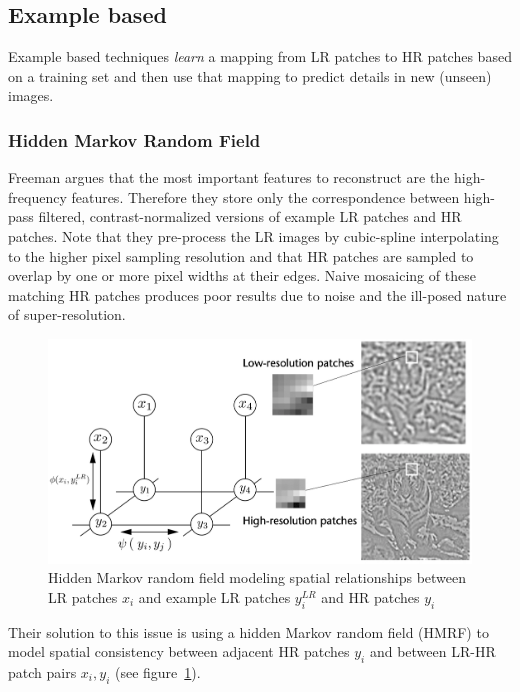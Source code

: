 \subsection{Example based}\label{subsec:example-based}

Example based techniques \textit{learn} a mapping from
LR patches to HR patches based on a training set and then use that mapping to predict details in new (unseen) images.

\subsubsection{Hidden Markov Random Field}

Freeman \etal\cite{freeman2002example} argues that the most important features to reconstruct are the high-frequency features.
%
Therefore they store only the correspondence between high-pass filtered, contrast-normalized versions of example LR patches and HR patches.
%
Note that they pre-process the LR images by cubic-spline interpolating to the higher pixel sampling resolution and that HR patches are sampled to overlap by one or more pixel widths at their edges.
%
Naive mosaicing of these matching HR patches produces poor results due to noise and the ill-posed nature of super-resolution.
%
\begin{figure}
	\centering
	\includegraphics[width=\linewidth,keepaspectratio]{figures/classical/mrf.png}
	\caption{Hidden Markov random field modeling spatial relationships between LR patches $x_i$ and example LR patches $y_i^{LR}$ and HR patches $y_i$\cite{freeman2002example}}
	\label{fig:mrf}
\end{figure}
Their solution to this issue is using a hidden Markov random field (HMRF) to model spatial consistency between adjacent HR patches $y_i$ and between LR-HR patch pairs $x_i, y_i$ (see figure~\ref{fig:mrf}).
